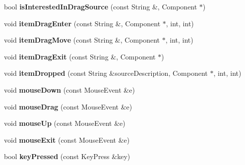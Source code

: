 \begin{DoxyCompactItemize}
\item 
\hypertarget{classEditorViewport_adb0fd596073954d1ece43739e5925d33}{bool {\bfseries is\-Interested\-In\-Drag\-Source} (const String \&, Component $\ast$)}\label{classEditorViewport_adb0fd596073954d1ece43739e5925d33}

\item 
\hypertarget{classEditorViewport_a14cb153a6f1ca97584c3bfa88d5839e4}{void {\bfseries item\-Drag\-Enter} (const String \&, Component $\ast$, int, int)}\label{classEditorViewport_a14cb153a6f1ca97584c3bfa88d5839e4}

\item 
\hypertarget{classEditorViewport_a99630d7cff4060355eb33b523a1ff662}{void {\bfseries item\-Drag\-Move} (const String \&, Component $\ast$, int, int)}\label{classEditorViewport_a99630d7cff4060355eb33b523a1ff662}

\item 
\hypertarget{classEditorViewport_aa0a6e241e6900665b4cd83ca75da169c}{void {\bfseries item\-Drag\-Exit} (const String \&, Component $\ast$)}\label{classEditorViewport_aa0a6e241e6900665b4cd83ca75da169c}

\item 
\hypertarget{classEditorViewport_a28feb4315615bf02650df7d9df8230da}{void {\bfseries item\-Dropped} (const String \&source\-Description, Component $\ast$, int, int)}\label{classEditorViewport_a28feb4315615bf02650df7d9df8230da}

\item 
\hypertarget{classEditorViewport_ae5ea71d59fb37b2888a451d7ad96a0af}{void {\bfseries mouse\-Down} (const Mouse\-Event \&e)}\label{classEditorViewport_ae5ea71d59fb37b2888a451d7ad96a0af}

\item 
\hypertarget{classEditorViewport_a0945e16ac793100d8a30d1f0b9dd7618}{void {\bfseries mouse\-Drag} (const Mouse\-Event \&e)}\label{classEditorViewport_a0945e16ac793100d8a30d1f0b9dd7618}

\item 
\hypertarget{classEditorViewport_a839c651c6aaf978166a59eb8268c9728}{void {\bfseries mouse\-Up} (const Mouse\-Event \&e)}\label{classEditorViewport_a839c651c6aaf978166a59eb8268c9728}

\item 
\hypertarget{classEditorViewport_a30efef0c60d508fdb5f94efc6729e315}{void {\bfseries mouse\-Exit} (const Mouse\-Event \&e)}\label{classEditorViewport_a30efef0c60d508fdb5f94efc6729e315}

\item 
\hypertarget{classEditorViewport_a949986b1e5866860a76b91f96fc68c54}{bool {\bfseries key\-Pressed} (const Key\-Press \&key)}\label{classEditorViewport_a949986b1e5866860a76b91f96fc68c54}


\end{DoxyCompactItemize}
